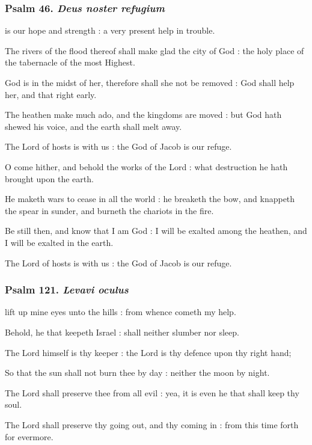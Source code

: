 \subsubsection{Psalm 46. \textit{Deus noster refugium}}
 is our hope and strength : a very present help in trouble.\par
{}
The rivers of the flood thereof shall make glad the city of God : the holy place of the tabernacle of the most Highest.\par
{}God is in the midst of her, therefore shall she not be removed : God shall help her, and that right early.\par
{}The heathen make much ado, and the kingdoms are moved : but God hath shewed his voice, and the earth shall melt away.\par
{}The Lord of hosts is with us : the God of Jacob is our refuge.\par
{}O come hither, and behold the works of the Lord : what destruction he hath brought upon the earth.\par
{}He maketh wars to cease in all the world : he breaketh the bow, and knappeth the spear in sunder, and burneth the chariots in the fire.\par
{}Be still then, and know that I am God : I will be exalted among the heathen, and I will be exalted in the earth.\par
{}The Lord of hosts is with us : the God of Jacob is our refuge.\par

\subsubsection{Psalm 121. \textit{Levavi oculus}}
 lift up mine eyes unto the hills : from whence cometh my help.\par
{}
Behold, he that keepeth Israel : shall neither slumber nor sleep.\par
{}The Lord himself is thy keeper : the Lord is thy defence upon thy right hand;\par
{}So that the sun shall not burn thee by day : neither the moon by night.\par
{}The Lord shall preserve thee from all evil : yea, it is even he that shall keep thy soul.\par
{}The Lord shall preserve thy going out, and thy coming in : from this time forth for evermore.\par

